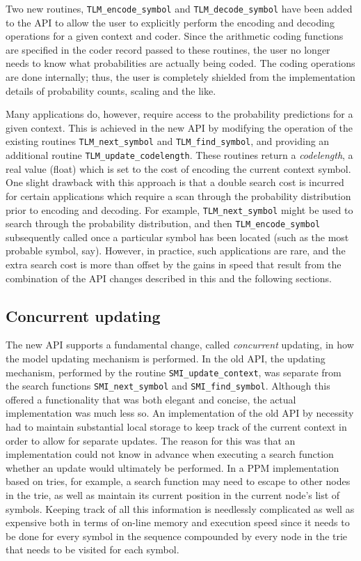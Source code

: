 \documentclass[11pt]{article}
\begin{document}
Two new routines, \verb|TLM_encode_symbol| and
\verb|TLM_decode_symbol| have been added to the API to allow the user to explicitly perform
the encoding and decoding operations for a given context and coder. Since the arithmetic coding functions
are specified in the coder record passed to these routines, the user no longer needs to know
what probabilities are actually being coded. The coding operations are done internally; thus, the user
is completely shielded from the implementation details of probability counts, scaling and the like.

Many applications do, however, require access to the probability predictions for a given
context. This is achieved in the new API by modifying the operation of the
existing routines \verb|TLM_next_symbol| and \verb|TLM_find_symbol|, and providing an
additional routine \verb|TLM_update_codelength|. These routines
return a {\em codelength}, a real value (float) which is set to the cost of encoding the
current context symbol. One slight drawback with this approach is that a double search cost
is incurred for certain applications which require a scan through the probability distribution prior
to encoding and decoding. For example, \verb|TLM_next_symbol| might be used to search through the probability
distribution, and then \verb|TLM_encode_symbol| subsequently called once a particular symbol has been
located (such as the most probable symbol, say). However, in practice, such applications are rare, and the
extra search cost is more than offset by the gains in speed that result from the combination of the
API changes described in this and the following sections.

\subsection{Concurrent updating}
\label{section.concurrent}

The new API supports a fundamental change, called {\em concurrent} updating, in how the
model updating mechanism is performed. In the old API, the updating mechanism, performed by the routine
\verb|SMI_update_context|, was separate from the search functions \verb|SMI_next_symbol|
and \verb|SMI_find_symbol|. Although this offered a functionality that was both elegant and concise, the
actual implementation was much less so. An implementation of the old API by necessity had to maintain
substantial local storage to keep track of the current context in order to allow for separate updates.
The reason for this was that an implementation could not know in advance when executing
a search function whether an update would ultimately be performed. In a PPM implementation
based on tries, for example, a search function may need to escape to other nodes in the trie, as well as
maintain its current position in the current node's list of symbols. Keeping track of all this
information is needlessly complicated as well as expensive both in terms of on-line memory and execution speed
since it needs to be done for every symbol in the sequence compounded by every node in the trie that
needs to be visited for each symbol.
\end{document}
